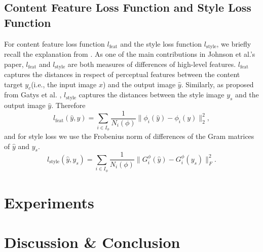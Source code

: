 \documentclass[10pt,twocolumn,letterpaper]{article}
\begin{document}
\subsection{Content Feature Loss Function and Style Loss Function}
For content feature loss function $l_\text{feat}$ and the style loss function $l_\text{style}$, we briefly recall the explanation from \cite{johnson2016perceptual}. As one of the main contributions in Johnson et al.'s paper, $l_\text{feat}$ and $l_\text{style}$ are both measures of differences of high-level features. $l_\text{feat}$ captures the distances in respect of perceptual features between the content target $y_c$(i.e., the input image $x$) and the output image $\hat y$. Similarly, as proposed from Gatys et al. \cite{gatys2016image}, $l_\text{style}$ captures the distances between the style image $y_s$ and the output image $\hat y$. 
Therefore
\[ l_\text{feat}(\hat y, y) = \sum_{i \in I_\phi} \frac{1}{N_i(\phi)}\|\phi_i(\hat y) - \phi_i(y)\|_2^2, \]
and for style loss we use the Frobenius norm of differences of the Gram matrices of $\hat y$ and $y_s$.
\[ l_\text{style}(\hat y, y_s) = \sum_{i \in I_\phi} \frac{1}{N_i(\phi)}\|G^\phi_i(\hat y) - G^\phi_i(y_s)\|_F^2. \]
\section{Experiments}

\section{Discussion \& Conclusion}



{\small


}
\end{document}
